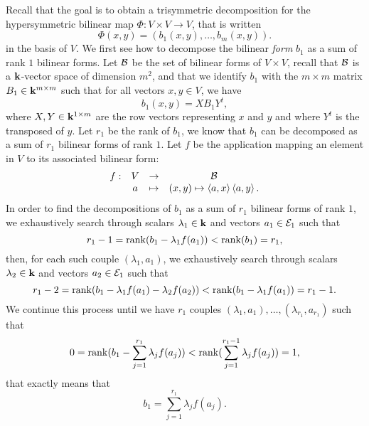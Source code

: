 Recall that the goal is to obtain a trisymmetric decomposition for the
hypersymmetric bilinear map $\Phi:V\times V\to V$, that is written
\[
  \Phi(x, y) = (b_1(x, y), \dots, b_m(x, y)).
\]
in the basis of $V$. We first see how to decompose the bilinear \emph{form}
$b_1$ as a sum of rank $1$ bilinear forms. Let $\mathcal{B}$ be the set of bilinear forms
of $V\times V$, recall that $\mathcal{B}$ is a $\mathbf{k}$-vector space of dimension $m^2$, and
that we identify $b_1$ with the $m\times m$ matrix $B_1\in\mathbf{k}^{m\times m}$ 
such that for all vectors $x, y\in V$, we have
\[
  b_1(x, y) = X B_1 Y^t,
\]
where $X, Y\in\mathbf{k}^{1\times m}$ are the row vectors representing $x$ and $y$ and
where $Y^t$ is the transposed of $y$. Let $r_1$ be the rank of $b_1$, we know
that $b_1$ can be decomposed as a sum of $r_1$ bilinear forms of rank $1$. Let
$f$ be the application mapping an element in $V$ to its associated bilinear
form:
\[
  \begin{array}{cccc}
    f: & V & \to & \mathcal{B}\\
    & a & \mapsto & (x, y)\mapsto\left\langle a,x\right\rangle\left\langle a,y\right\rangle.
  \end{array}
\]
In order to find the decompositions of $b_1$ as a sum of $r_1$ bilinear forms of
rank $1$, we exhaustively search through scalars $\lambda_1\in\mathbf{k}$ and vectors
$a_1\in \mathcal{E}_1$ such that
\[
  r_1-1=\operatorname{rank}(b_1-\lambda_1 f(a_1)) < \operatorname{rank}(b_1)=r_1,
\]
then, for each such couple $(\lambda_1, a_1)$, we exhaustively search through
scalars $\lambda_2\in\mathbf{k}$ and vectors $a_2\in \mathcal{E}_1$ such that
\[
  r_1-2=\operatorname{rank}(b_1-\lambda_1 f(a_1)-\lambda_2f(a_2)) < \operatorname{rank}(b_1-\lambda_1
  f(a_1))=r_1-1.
\]
We continue this process until we have $r_1$ couples $(\lambda_1, a_1), \dots,
(\lambda_{r_1}, a_{r_1})$ such that
\[
  0 = \operatorname{rank}(b_1-\sum_{j=1}^{r_1}\lambda_jf(a_j)) <
  \operatorname{rank}(\sum_{j=1}^{r_1-1}\lambda_jf(a_j)) = 1,
\]
that exactly means that
\[
  b_1 = \sum_{j=1}^{r_1}\lambda_jf(a_j).
\]
